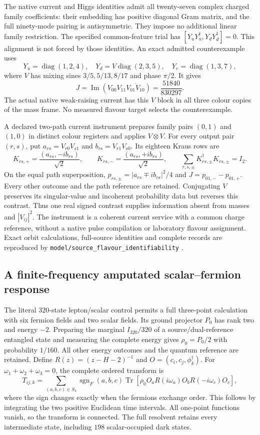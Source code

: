 The native current and Higgs identities admit all twenty-seven complex
charged family coefficients: their embedding has positive diagonal
Gram matrix, and the full ninety-mode pairing is antisymmetric.
They impose no additional linear family restriction. The specified
common-feature trial has $[Y_uY_u^\dagger,Y_dY_d^\dagger]=0$.
This alignment is not forced by those identities. An exact admitted
counterexample uses
\[
 Y_u=\operatorname{diag}(1,2,4),\quad
 Y_d=V\operatorname{diag}(2,3,5),\quad
 Y_e=\operatorname{diag}(1,3,7),
\]
where $V$ has mixing sines $3/5,5/13,8/17$ and phase $\pi/2$. It gives
\[
 J=\operatorname{Im}(V_{00}V_{11}\overline{V_{01}V_{10}})
   =\frac{51840}{830297}.
\]
The actual native weak-raising current has this $V$ block in all three
colour copies of the mass frame. No measured flavour target selects
the counterexample.

A declared two-path current instrument prepares family pairs $(0,1)$
and $(1,0)$ in distinct colour registers and applies $V\otimes V$.
For every output pair $(r,s)$, put $a_{rs}=V_{r0}V_{s1}$ and
$b_{rs}=V_{r1}V_{s0}$. Its eighteen Kraus rows are
\[
 K_{rs,+}=\frac{(a_{rs},-ib_{rs})}{\sqrt2},\qquad
 K_{rs,-}=\frac{(a_{rs},+ib_{rs})}{\sqrt2},\qquad
 \sum_{r,s,\pm}K_{rs,\pm}^\dagger K_{rs,\pm}=I_2.
\]
On the equal path superposition,
$p_{rs,\pm}=|a_{rs}\mp ib_{rs}|^2/4$ and
$J=p_{01,-}-p_{01,+}$. Every other outcome and the path reference are
retained. Conjugating $V$ preserves its singular-value and incoherent
probability data but reverses this contrast. Thus one real signed
contrast supplies information absent from masses and $|V_{ij}|^2$.
The instrument is a coherent current service with a common charge
reference, without a native pulse compilation or laboratory flavour
assignment. Exact orbit calculations, full-source identities and complete
records are reproduced by
\texttt{model/source\_flavour\_identifiability} \cite{ophrepo}.

\subsection{A finite-frequency amputated scalar--fermion response}

The literal $320$-state lepton/scalar control permits a full three-point
calculation with six fermion fields and two scalar fields. Its ground
projector $P_0$ has rank two and energy $-2$. Preparing the marginal
$I_{320}/320$ of a source/dual-reference entangled state and measuring
the complete energy gives $\rho_0=P_0/2$ with probability $1/160$.
All other energy outcomes and the quantum reference are retained.
Define $R(z)=(z-H-2)^{-1}$ and $O=(c_i,c_j,\phi_k^\dagger)$.
For $\omega_1+\omega_2+\omega_3=0$, the complete ordered transform is
\[
 T_{ij,k}=\sum_{(a,b,c)\in S_3}\operatorname{sgn}_F(a,b,c)
 \operatorname{Tr}\!\left[
 \rho_0O_aR(i\omega_a)O_bR(-i\omega_c)O_c\right],
\]
where the sign changes exactly when the fermions exchange order.
This follows by integrating the two positive Euclidean time intervals.
All one-point functions vanish, so the transform is connected. The
full resolvent retains every intermediate state, including $198$
scalar-occupied dark states.

